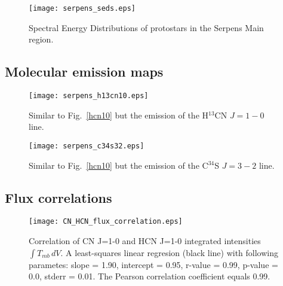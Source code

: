 \documentclass{aa}
\begin{document}
\begin{appendix}
\begin{figure}
   \texttt{[image: serpens\_seds.eps]}
      \caption{Spectral Energy Distributions of protostars in the Serpens Main region.}
         \label{seds}
   \end{figure}

\end{appendix}

\begin{appendix} %
\section{Molecular emission maps}

\begin{figure}
\texttt{[image: serpens\_h13cn10.eps]}
\caption{Similar to Fig.~\ref{hcn10} but the emission of the H$^{13}$CN $J=1-0$ line.}
\label{h13cn10}
\end{figure}


\begin{figure}
\texttt{[image: serpens\_c34s32.eps]}
\caption{Similar to Fig.~\ref{hcn10} but the emission of the C$^{34}$S $J=3-2$ line.}
\label{c34s32}
\end{figure}

\end{appendix}

\begin{appendix} %
\section{Flux correlations}

\begin{figure}
\texttt{[image: CN\_HCN\_flux\_correlation.eps]}
\caption{Correlation of CN J=1-0 and HCN J=1-0 integrated intensities $\int{T_{mb} \, dV}$. A least-squares linear regresion (black line) with following parametes: slope = 1.90, intercept = 0.95, r-value = 0.99, p-value = 0.0, stderr = 0.01. The Pearson correlation coefficient equals 0.99. }
\label{h13cn10}
\end{figure}

\end{appendix}
\end{document}

